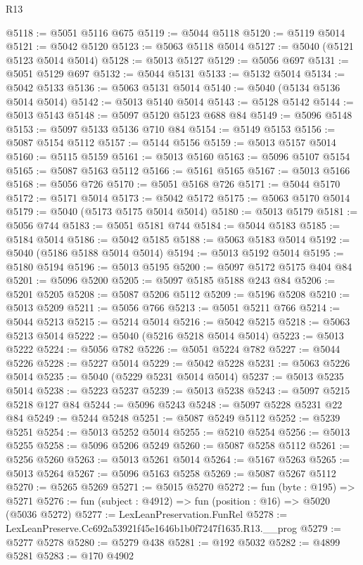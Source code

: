 \begin{lexlean}{R13}
\begin{coremodule}
@5118 := @5051 @5116 @675
@5119 := @5044 @5118
@5120 := @5119 @5014
@5121 := @5042 @5120
@5123 := @5063 @5118 @5014
@5127 := @5040 (@5121 @5123 @5014 @5014)
@5128 := @5013 @5127
@5129 := @5056 @697
@5131 := @5051 @5129 @697
@5132 := @5044 @5131
@5133 := @5132 @5014
@5134 := @5042 @5133
@5136 := @5063 @5131 @5014
@5140 := @5040 (@5134 @5136 @5014 @5014)
@5142 := @5013 @5140 @5014
@5143 := @5128 @5142
@5144 := @5013 @5143
@5148 := @5097 @5120 @5123 @688 @84
@5149 := @5096 @5148
@5153 := @5097 @5133 @5136 @710 @84
@5154 := @5149 @5153
@5156 := @5087 @5154 @5112
@5157 := @5144 @5156
@5159 := @5013 @5157 @5014
@5160 := @5115 @5159
@5161 := @5013 @5160
@5163 := @5096 @5107 @5154
@5165 := @5087 @5163 @5112
@5166 := @5161 @5165
@5167 := @5013 @5166
@5168 := @5056 @726
@5170 := @5051 @5168 @726
@5171 := @5044 @5170
@5172 := @5171 @5014
@5173 := @5042 @5172
@5175 := @5063 @5170 @5014
@5179 := @5040 (@5173 @5175 @5014 @5014)
@5180 := @5013 @5179
@5181 := @5056 @744
@5183 := @5051 @5181 @744
@5184 := @5044 @5183
@5185 := @5184 @5014
@5186 := @5042 @5185
@5188 := @5063 @5183 @5014
@5192 := @5040 (@5186 @5188 @5014 @5014)
@5194 := @5013 @5192 @5014
@5195 := @5180 @5194
@5196 := @5013 @5195
@5200 := @5097 @5172 @5175 @404 @84
@5201 := @5096 @5200
@5205 := @5097 @5185 @5188 @243 @84
@5206 := @5201 @5205
@5208 := @5087 @5206 @5112
@5209 := @5196 @5208
@5210 := @5013 @5209
@5211 := @5056 @766
@5213 := @5051 @5211 @766
@5214 := @5044 @5213
@5215 := @5214 @5014
@5216 := @5042 @5215
@5218 := @5063 @5213 @5014
@5222 := @5040 (@5216 @5218 @5014 @5014)
@5223 := @5013 @5222
@5224 := @5056 @782
@5226 := @5051 @5224 @782
@5227 := @5044 @5226
@5228 := @5227 @5014
@5229 := @5042 @5228
@5231 := @5063 @5226 @5014
@5235 := @5040 (@5229 @5231 @5014 @5014)
@5237 := @5013 @5235 @5014
@5238 := @5223 @5237
@5239 := @5013 @5238
@5243 := @5097 @5215 @5218 @127 @84
@5244 := @5096 @5243
@5248 := @5097 @5228 @5231 @22 @84
@5249 := @5244 @5248
@5251 := @5087 @5249 @5112
@5252 := @5239 @5251
@5254 := @5013 @5252 @5014
@5255 := @5210 @5254
@5256 := @5013 @5255
@5258 := @5096 @5206 @5249
@5260 := @5087 @5258 @5112
@5261 := @5256 @5260
@5263 := @5013 @5261 @5014
@5264 := @5167 @5263
@5265 := @5013 @5264
@5267 := @5096 @5163 @5258
@5269 := @5087 @5267 @5112
@5270 := @5265 @5269
@5271 := @5015 @5270
@5272 := fun (byte : @195) => @5271
@5276 := fun (subject : @4912) => fun (position : @16) => @5020 (@5036 @5272)
@5277 := LexLeanPreservation.FunRel
@5278 := LexLeanPreserve.Cc692a53921f45e1646b1b0f7247f1635.R13.__prog
@5279 := @5277 @5278
@5280 := @5279 @438
@5281 := @192 @5032
@5282 := @4899 @5281
@5283 := @170 @4902

\end{coremodule}
\end{lexlean}
